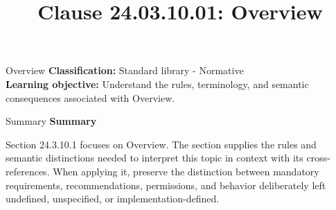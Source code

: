 \documentclass[10pt,letterpaper]{article}
\title{Clause 24.03.10.01: Overview}
\author{}
\date{}
\begin{document}
\maketitle
\begin{CornellOverviewBox}{Overview}
\textbf{Classification:} Standard library - Normative\\[2pt]
\textbf{Learning objective:} Understand the rules, terminology, and semantic consequences associated with Overview.
\end{CornellOverviewBox}\begin{CornellSummaryBox}{Summary}
{\sffamily\bfseries\color{Accent} Summary}\par\vspace{3pt}Section 24.3.10.1 focuses on Overview. The section supplies the rules and semantic distinctions needed to interpret this topic in context with its cross-references. When applying it, preserve the distinction between mandatory requirements, recommendations, permissions, and behavior deliberately left undefined, unspecified, or implementation-defined.
\end{CornellSummaryBox}
\end{document}
